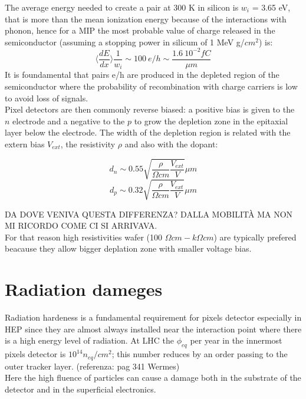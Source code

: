    The average energy needed to create a pair at 300 K in silicon is $w_i$ = 3.65 eV, that is more than the mean ionization energy because of the interactions with phonon, hence for a MIP the most probable value of charge released in the semiconductor (assuming a stopping power in silicum of 1 MeV g/$cm^2$) is: 
    \begin{equation}
        \langle \frac{dE}{dx}\rangle \frac{1}{w_i} \sim 100 \: e/h \sim \frac{1.6 \:10^{-2}fC}{\mu m}
    \end{equation}
    It is foundamental that pairs e/h are produced in the depleted region of the semiconductor where the probability of recombination with charge carriers is low to avoid loss of signals.\\
    Pixel detectors are then commonly reverse biased: a positive bias is given to the $n$ electrode and a negative to the $p$
    to grow the depletion zone in the epitaxial layer below the electrode. The width of the depletion region is related with the extern bias $V_{ext}$, the resistivity $\rho$ and also with the dopant:
    \begin{multicols}{2}
        \begin{equation}
            d_{n} \sim 0.55 \sqrt{\frac{\rho}{\Omega cm}\frac{V_{ext}}{V}} \mu m 
        \end{equation}\break
        \begin{equation}
            d_{p} \sim 0.32 \sqrt{\frac{\rho}{\Omega cm}\frac{V_{ext}}{V}} \mu m
        \end{equation}
        \label{eq:deplation_d}
    \end{multicols}
    DA DOVE VENIVA QUESTA DIFFERENZA? DALLA MOBILITÀ MA NON MI RICORDO COME CI SI ARRIVAVA.\\
    For that reason high resistivities wafer (100 $\Omega cm - k\Omega cm$) are typically prefered beacause they allow bigger deplation zone with smaller voltage bias. 

\section{Radiation dameges}
    Radiation hardeness is a fundamental requirement for pixels detector especially in HEP since they are almost always installed near the interaction point where there is a high energy level of radiation. At LHC the $\phi_{eq}$ per year in the innermost pixels detector is $10^{14} n_{eq}/cm^2$; this number reduces by an order passing to the outer tracker layer. (referenza: pag 341 Wermes)\\ 
    Here the high fluence of particles can cause a damage both in the substrate of the detector and in the superficial electronics. 
    
